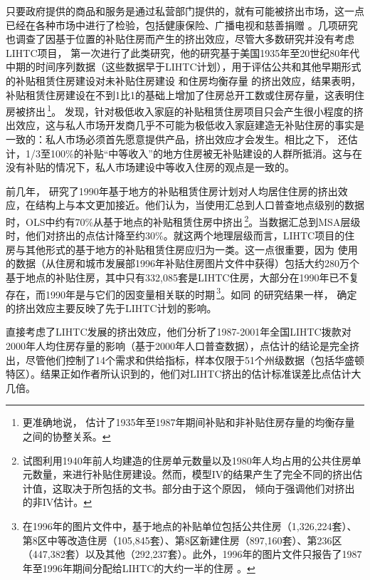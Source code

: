 \documentclass[lang=cn,11pt,a4paper]{paper}
\begin{document}
只要政府提供的商品和服务是通过私营部门提供的，就有可能被挤出市场，这一点已经在各种市场中进行了检验，包括健康保险、广播电视和慈善捐赠 \citep{Cutler1996391,Berry1999189,Andreoni2003792}。几项研究也调查了因基于位置的补贴住房而产生的挤出效应，尽管大多数研究并没有考虑LIHTC项目，\cite{Murray1983590,Murray1999107} 第一次进行了此类研究，他的研究基于美国1935年至20世纪80年代中期的时间序列数据（这些数据早于LIHTC计划），用于评估公共和其他早期形式的补贴租赁住房建设对未补贴住房建设 \citep{Murray1983590} 和住房均衡存量 \citep{Murray1999107} 的挤出效应，结果表明，补贴租赁住房建设在不到1比1的基础上增加了住房总开工数或住房存量，这表明住房被挤出\,\footnote{更准确地说，\cite{Murray1999107} 估计了1935年至1987年期间补贴和非补贴住房存量的均衡存量之间的协整关系。}。\cite{Murray1999107} 发现，针对极低收入家庭的补贴租赁住房项目只会产生很小程度的挤出效应，这与私人市场开发商几乎不可能为极低收入家庭建造无补贴住房的事实是一致的：私人市场必须首先愿意提供产品，挤出效应才会发生。相比之下，\cite{Murray1999107} 还估计，1/3至100\%的补贴“中等收入”的地方住房被无补贴建设的人群所抵消。这与在没有补贴的情况下，私人市场建设中等收入住房的观点是一致的。

前几年，\cite{Sinai20052137} 研究了1990年基于地方的补贴租赁住房计划对人均居住住房的挤出效应，在结构上与本文更加接近。他们认为，当使用汇总到人口普查地点级别的数据时，OLS中约有70\%从基于地点的补贴租赁住房中挤出\,\footnote{\cite{Sinai20052137} 试图利用1940年前人均建造的住房单元数量以及1980年人均占用的公共住房单元数量，来进行补贴住房建设。然而，模型IV的结果产生了完全不同的挤出估计值，这取决于所包括的文书。部分由于这个原因，\cite{Sinai20052137} 倾向于强调他们对挤出的非IV估计。}。当数据汇总到MSA层级时，他们对挤出的点估计降至约30\%。就这两个地理层级而言，LIHTC项目的住房与其他形式的基于地方的补贴租赁住房应归为一类。这一点很重要，因为 \cite{Sinai20052137} 使用的数据（从住房和城市发展部1996年补贴住房图片文件中获得）包括大约280万个基于地点的补贴住房，其中只有332,085套是LIHTC住房，大部分在1990年已不复存在，而1990年是与它们的因变量相关联的时期\,\footnote{在1996年的图片文件中，基于地点的补贴单位包括公共住房（1,326,224套）、第8区中等改造住房（105,845套）、第8区新建住房（897,160套）、第236区（447,382套）以及其他（292,237套）。此外，1996年的图片文件只报告了1987年至1996年期间分配给LIHTC的大约一半的住房 \citep{Malpezzi2002360}。}。如同 \cite{Murray1983590,Murray1999107} 的研究结果一样，\cite{Sinai20052137} 确定的挤出效应主要反映了先于LIHTC计划的影响。

\cite{Malpezzi2002360} 直接考虑了LIHTC发展的挤出效应，他们分析了1987-2001年全国LIHTC拨款对2000年人均住房存量的影响（基于2000年人口普查数据），点估计的结论是完全挤出，尽管他们控制了14个需求和供给指标，样本仅限于51个州级数据（包括华盛顿特区）。结果正如作者所认识到的，他们对LIHTC挤出的估计标准误差比点估计大几倍。
\end{document}
